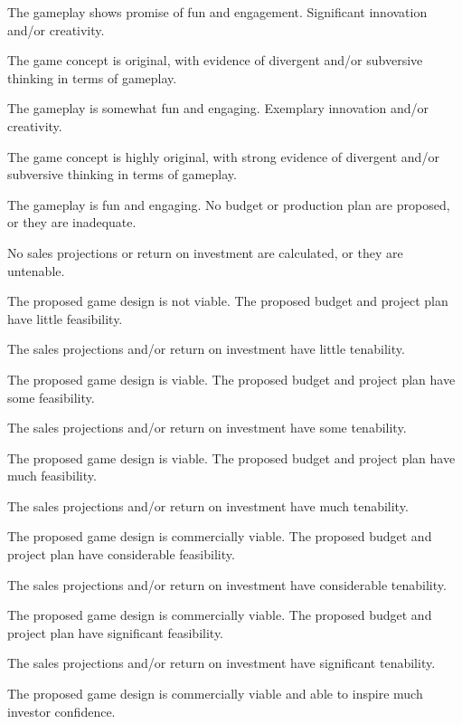 \documentclass{../fal_assignment}
\begin{document}
\begin{markingrubric}
            \par The gameplay shows promise of fun and engagement.
        \grade Significant innovation and/or creativity.
            \par The game concept is original, with evidence of divergent and/or subversive thinking in terms of gameplay.
            \par The gameplay is somewhat fun and engaging.
        \grade Exemplary innovation and/or creativity.
            \par The game concept is highly original, with strong evidence of divergent and/or subversive thinking in terms of gameplay.
            \par The gameplay is fun and engaging.
%
        \grade\fail No budget or production plan are proposed, or they are inadequate.
            \par No sales projections or return on investment are calculated, or they are untenable.
            \par The proposed game design is not viable.
        \grade The proposed budget and project plan have little feasibility.
            \par The sales projections and/or return on investment have little tenability.
            \par The proposed game design is viable.
        \grade The proposed budget and project plan have some feasibility.
            \par The sales projections and/or return on investment have some tenability.
            \par The proposed game design is viable.
        \grade The proposed budget and project plan have much feasibility.
            \par The sales projections and/or return on investment have much tenability.
            \par The proposed game design is commercially viable.
        \grade The proposed budget and project plan have considerable feasibility.
            \par The sales projections and/or return on investment have considerable tenability.
            \par The proposed game design is commercially viable.
        \grade The proposed budget and project plan have significant feasibility.
            \par The sales projections and/or return on investment have significant tenability.
            \par The proposed game design is commercially viable and able to inspire much investor confidence.
\end{markingrubric}
\end{document}
